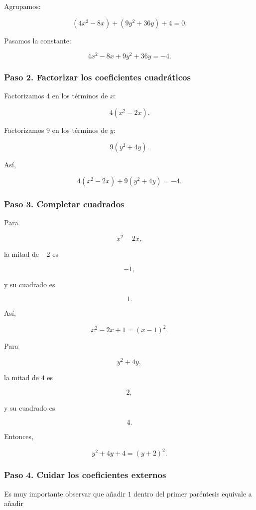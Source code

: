 \documentclass[12pt]{article}
\begin{document}
Agrupamos:

\[
(4x^2-8x)+(9y^2+36y)+4=0.
\]

Pasamos la constante:

\[
4x^2-8x+9y^2+36y=-4.
\]

\subsubsection*{Paso 2. Factorizar los coeficientes cuadráticos}

Factorizamos \(4\) en los términos de \(x\):

\[
4(x^2-2x).
\]

Factorizamos \(9\) en los términos de \(y\):

\[
9(y^2+4y).
\]

Así,

\[
4(x^2-2x)+9(y^2+4y)=-4.
\]

\subsubsection*{Paso 3. Completar cuadrados}

Para

\[
x^2-2x,
\]

la mitad de \(-2\) es

\[
-1,
\]

y su cuadrado es

\[
1.
\]

Así,

\[
x^2-2x+1=(x-1)^2.
\]

Para

\[
y^2+4y,
\]

la mitad de \(4\) es

\[
2,
\]

y su cuadrado es

\[
4.
\]

Entonces,

\[
y^2+4y+4=(y+2)^2.
\]

\subsubsection*{Paso 4. Cuidar los coeficientes externos}

Es muy importante observar que añadir \(1\) dentro del primer
paréntesis equivale a añadir
\end{document}

